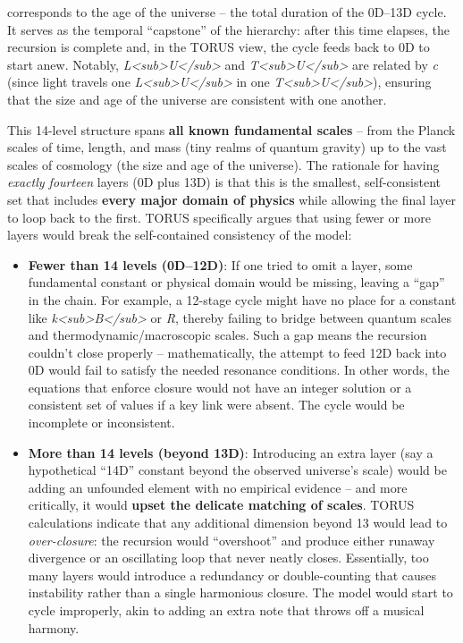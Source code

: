 \begin{itemize}
  corresponds to the age of the universe -- the total duration of the
  0D--13D cycle. It serves as the temporal ``capstone'' of the
  hierarchy: after this time elapses, the recursion is complete and, in
  the TORUS view, the cycle feeds back to 0D to start anew. Notably,
  \emph{L\textless{}sub\textgreater{}U\textless{}/sub\textgreater{}} and
  \emph{T\textless{}sub\textgreater{}U\textless{}/sub\textgreater{}} are
  related by \emph{c} (since light travels one
  \emph{L\textless{}sub\textgreater{}U\textless{}/sub\textgreater{}} in
  one
  \emph{T\textless{}sub\textgreater{}U\textless{}/sub\textgreater{}}),
  ensuring that the size and age of the universe are consistent with one
  another​.
\end{itemize}

This 14-level structure spans \textbf{all known fundamental scales} --
from the Planck scales of time, length, and mass (tiny realms of quantum
gravity) up to the vast scales of cosmology (the size and age of the
universe)​. The rationale for having \emph{exactly fourteen} layers (0D
plus 13D) is that this is the smallest, self-consistent set that
includes \textbf{every major domain of physics} while allowing the final
layer to loop back to the first. TORUS specifically argues that using
fewer or more layers would break the self-contained consistency of the
model:

\begin{itemize}
\item
  \textbf{Fewer than 14 levels (0D--12D)}: If one tried to omit a layer,
  some fundamental constant or physical domain would be missing, leaving
  a ``gap'' in the chain. For example, a 12-stage cycle might have no
  place for a constant like
  \emph{k\textless{}sub\textgreater{}B\textless{}/sub\textgreater{}} or
  \emph{R}, thereby failing to bridge between quantum scales and
  thermodynamic/macroscopic scales​. Such a gap means the recursion
  couldn't close properly -- mathematically, the attempt to feed 12D
  back into 0D would fail to satisfy the needed resonance conditions. In
  other words, the equations that enforce closure would not have an
  integer solution or a consistent set of values if a key link were
  absent​. The cycle would be incomplete or inconsistent.
\item
  \textbf{More than 14 levels (beyond 13D)}: Introducing an extra layer
  (say a hypothetical ``14D'' constant beyond the observed universe's
  scale) would be adding an unfounded element with no empirical evidence
  -- and more critically, it would \textbf{upset the delicate matching
  of scales}. TORUS calculations indicate that any additional dimension
  beyond 13 would lead to \emph{over-closure}: the recursion would
  ``overshoot'' and produce either runaway divergence or an oscillating
  loop that never neatly closes​. Essentially, too many layers would
  introduce a redundancy or double-counting that causes instability
  rather than a single harmonious closure. The model would start to
  cycle improperly, akin to adding an extra note that throws off a
  musical harmony.
\end{itemize}

